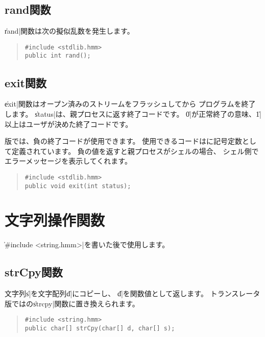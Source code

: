 \subsection{rand関数}

\|rand|関数は次の擬似乱数を発生します。

\begin{quote}
\begin{verbatim}
#include <stdlib.hmm>
public int rand();
\end{verbatim}
\end{quote}

\subsection{exit関数}

\|exit|関数はオープン済みのストリームをフラッシュしてから
プログラムを終了します。
\|status|は、親プロセスに返す終了コードです。
\|0|が正常終了の意味、\|1|以上はユーザが決めた終了コードです。

{\tacos}版では、負の終了コードが使用できます。
使用できるコードはに記号定数として定義されています。
負の値を返すと親プロセスがシェルの場合、
シェル側でエラーメッセージを表示してくれます。

\begin{quote}
\begin{verbatim}
#include <stdlib.hmm>
public void exit(int status);
\end{verbatim}
\end{quote}

\section{文字列操作関数}

\|#include <string.hmm>|を書いた後で使用します。

\subsection{strCpy関数}

文字列\|s|を文字配列\|d|にコピーし、
\|d|を関数値として返します。
トランスレータ版では\cl の\|strcpy|関数に置き換えられます。

\begin{quote}
\begin{verbatim}
#include <string.hmm>
public char[] strCpy(char[] d, char[] s);
\end{verbatim}
\end{quote}

